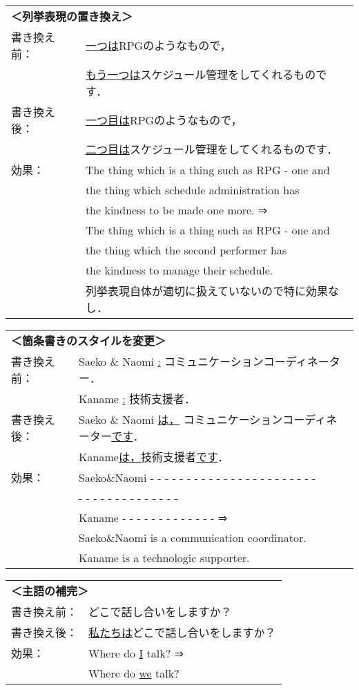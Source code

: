 \begin{tabular}{ll}
\multicolumn{2}{l}{\bf ＜列挙表現の置き換え＞}   \\
書き換え前： & \underline{一つは}RPGのようなもので， \\
             & \underline{もう一つは}スケジュール管理をしてくれるものです． \\
書き換え後： & \underline{一つ目は}RPGのようなもので， \\
             & \underline{二つ目は}スケジュール管理をしてくれるものです． \\
効果： & The thing which is a thing such as RPG - one and \\ 
       & the thing which schedule administration has \\
       & the kindness to be made one more. ⇒ \\
       & The thing which is a thing such as RPG - one and \\
       & the thing which the second performer has \\
       & the kindness to manage their schedule. \\
       & 列挙表現自体が適切に扱えていないので特に効果なし． \\
\end{tabular}

\begin{tabular}{ll}
\multicolumn{2}{l}{\bf ＜箇条書きのスタイルを変更＞}   \\
書き換え前： & Saeko \& Naomi \underline{:} コミュニケーションコーディネーター．\\
             & Kaname \underline{:} 技術支援者．\\
書き換え後： & Saeko \& Naomi \underline{は，}
               コミュニケーションコーディネーター\underline{です}． \\
             & Kaname\underline{は，}技術支援者\underline{です}．\\
効果： & Saeko\&Naomi - - - - - - - - - - - - - - - - - - - - - - - \\
       & - - - - - - - - - - - - - - \\
       & Kaname - - - - - - - - - - - - - ⇒ \\
       & Saeko\&Naomi is a communication coordinator. \\
       & Kaname is a technologic supporter. \\
\end{tabular}

\begin{tabular}{ll}
\multicolumn{2}{l}{\bf ＜主語の補完＞}   \\
書き換え前： & どこで話し合いをしますか？ \\
書き換え後： & \underline{私たちは}どこで話し合いをしますか？ \\
効果： & Where do \underline{I} talk? ⇒ \\
       & Where do \underline{we} talk? \\
\end{tabular}

